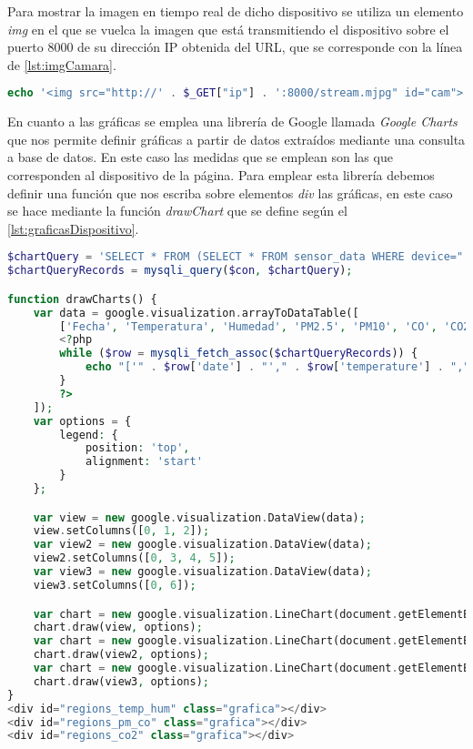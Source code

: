 Para mostrar la imagen en tiempo real de dicho dispositivo se utiliza un elemento \textit{img} en el que se vuelca la imagen que está transmitiendo el dispositivo sobre el puerto 8000 de su dirección IP obtenida del URL, que se corresponde con la línea de \autoref{lst:imgCamara}.
\begin{lstlisting}[language=PHP, caption=Cuadro de imagen de la cámara, label=lst:imgCamara]
echo '<img src="http://' . $_GET["ip"] . ':8000/stream.mjpg" id="cam">'
\end{lstlisting}

En cuanto a las gráficas se emplea una librería de Google llamada \textit{Google Charts} que nos permite definir gráficas a partir de datos extraídos mediante una consulta a base de datos. En este caso las medidas que se emplean son las que corresponden al dispositivo de la página. Para emplear esta librería debemos definir una función que nos escriba sobre elementos \textit{div} las gráficas, en este caso se hace mediante la función \textit{drawChart} que se define según el \autoref{lst:graficasDispositivo}.
\begin{lstlisting}[language=PHP, caption=Graficas de las medidas del dispositivo, label=lst:graficasDispositivo]
$chartQuery = 'SELECT * FROM (SELECT * FROM sensor_data WHERE device="' . $_GET["id"] . '" ORDER BY date DESC LIMIT 720) sub ORDER BY date ASC';
$chartQueryRecords = mysqli_query($con, $chartQuery);

function drawCharts() {
    var data = google.visualization.arrayToDataTable([
        ['Fecha', 'Temperatura', 'Humedad', 'PM2.5', 'PM10', 'CO', 'CO2'],
        <?php
        while ($row = mysqli_fetch_assoc($chartQueryRecords)) {
            echo "['" . $row['date'] . "'," . $row['temperature'] . "," . $row['humidity'] . "," . $row['pm2_5'] . "," . $row['pm10'] . "," . $row['co'] . "," . $row['co2'] . "],";
        }
        ?>
    ]);
    var options = {
        legend: {
            position: 'top',
            alignment: 'start'
        }
    };

    var view = new google.visualization.DataView(data);
    view.setColumns([0, 1, 2]);
    var view2 = new google.visualization.DataView(data);
    view2.setColumns([0, 3, 4, 5]);
    var view3 = new google.visualization.DataView(data);
    view3.setColumns([0, 6]);

    var chart = new google.visualization.LineChart(document.getElementById('regions_temp_hum'));
    chart.draw(view, options);
    var chart = new google.visualization.LineChart(document.getElementById('regions_pm_co'));
    chart.draw(view2, options);
    var chart = new google.visualization.LineChart(document.getElementById('regions_co2'));
    chart.draw(view3, options);
}
<div id="regions_temp_hum" class="grafica"></div>
<div id="regions_pm_co" class="grafica"></div>
<div id="regions_co2" class="grafica"></div>
\end{lstlisting}

